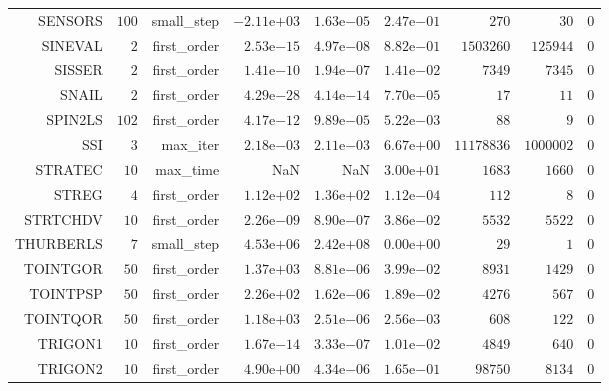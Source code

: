 \begin{longtable}{rrrrrrrrr}
SENSORS & \(   100\) & small\_step & \(-2.11\)e\(+03\) & \( 1.63\)e\(-05\) & \( 2.47\)e\(-01\) & \(   270\) & \(    30\) & \(     0\) \\
SINEVAL & \(     2\) & first\_order & \( 2.53\)e\(-15\) & \( 4.97\)e\(-08\) & \( 8.82\)e\(-01\) & \(1503260\) & \(125944\) & \(     0\) \\
SISSER & \(     2\) & first\_order & \( 1.41\)e\(-10\) & \( 1.94\)e\(-07\) & \( 1.41\)e\(-02\) & \(  7349\) & \(  7345\) & \(     0\) \\
SNAIL & \(     2\) & first\_order & \( 4.29\)e\(-28\) & \( 4.14\)e\(-14\) & \( 7.70\)e\(-05\) & \(    17\) & \(    11\) & \(     0\) \\
SPIN2LS & \(   102\) & first\_order & \( 4.17\)e\(-12\) & \( 9.89\)e\(-05\) & \( 5.22\)e\(-03\) & \(    88\) & \(     9\) & \(     0\) \\
SSI & \(     3\) & max\_iter & \( 2.18\)e\(-03\) & \( 2.11\)e\(-03\) & \( 6.67\)e\(+00\) & \(11178836\) & \(1000002\) & \(     0\) \\
STRATEC & \(    10\) & max\_time &       NaN &       NaN & \( 3.00\)e\(+01\) & \(  1683\) & \(  1660\) & \(     0\) \\
STREG & \(     4\) & first\_order & \( 1.12\)e\(+02\) & \( 1.36\)e\(+02\) & \( 1.12\)e\(-04\) & \(   112\) & \(     8\) & \(     0\) \\
STRTCHDV & \(    10\) & first\_order & \( 2.26\)e\(-09\) & \( 8.90\)e\(-07\) & \( 3.86\)e\(-02\) & \(  5532\) & \(  5522\) & \(     0\) \\
THURBERLS & \(     7\) & small\_step & \( 4.53\)e\(+06\) & \( 2.42\)e\(+08\) & \( 0.00\)e\(+00\) & \(    29\) & \(     1\) & \(     0\) \\
TOINTGOR & \(    50\) & first\_order & \( 1.37\)e\(+03\) & \( 8.81\)e\(-06\) & \( 3.99\)e\(-02\) & \(  8931\) & \(  1429\) & \(     0\) \\
TOINTPSP & \(    50\) & first\_order & \( 2.26\)e\(+02\) & \( 1.62\)e\(-06\) & \( 1.89\)e\(-02\) & \(  4276\) & \(   567\) & \(     0\) \\
TOINTQOR & \(    50\) & first\_order & \( 1.18\)e\(+03\) & \( 2.51\)e\(-06\) & \( 2.56\)e\(-03\) & \(   608\) & \(   122\) & \(     0\) \\
TRIGON1 & \(    10\) & first\_order & \( 1.67\)e\(-14\) & \( 3.33\)e\(-07\) & \( 1.01\)e\(-02\) & \(  4849\) & \(   640\) & \(     0\) \\
TRIGON2 & \(    10\) & first\_order & \( 4.90\)e\(+00\) & \( 4.34\)e\(-06\) & \( 1.65\)e\(-01\) & \( 98750\) & \(  8134\) & \(     0\) \\

\end{longtable}
